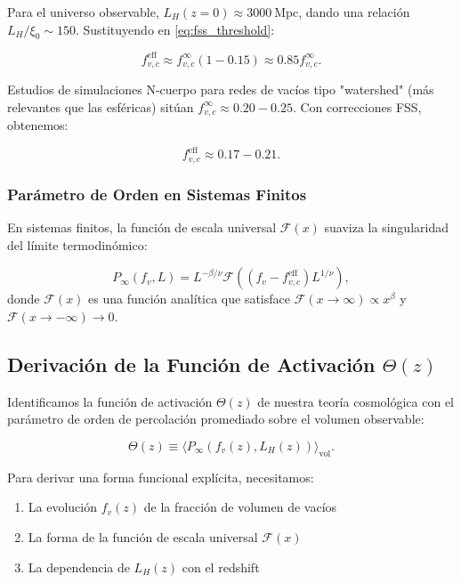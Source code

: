 \documentclass[12pt, a4paper]{article}
\theoremstyle{plain}
\theoremstyle{definition}
\begin{document}
Para el universo observable, $L_H(z=0) \approx 3000~\mathrm{Mpc}$, dando una relación $L_H/\xi_0 \sim 150$. Sustituyendo en \eqref{eq:fss_threshold}:

\begin{equation}
f_{v,c}^{\text{eff}} \approx f_{v,c}^{\infty} (1 - 0.15) \approx 0.85 f_{v,c}^{\infty}.
\end{equation}

Estudios de simulaciones N-cuerpo para redes de vacíos tipo "watershed" (más relevantes que las esféricas) sitúan $f_{v,c}^{\infty} \approx 0.20-0.25$. Con correcciones FSS, obtenemos:

\begin{equation}
f_{v,c}^{\text{eff}} \approx 0.17-0.21.
\label{eq:fv_critical_effective}
\end{equation}

\subsubsection{Parámetro de Orden en Sistemas Finitos}

En sistemas finitos, la función de escala universal $\mathcal{F}(x)$ suaviza la singularidad del límite termodinómico:

\begin{equation}
P_\infty(f_v, L) = L^{-\beta/\nu} \mathcal{F}\left( (f_v - f_{v,c}^{\text{eff}}) L^{1/\nu} \right),
\label{eq:fss_scaling}
\end{equation}
donde $\mathcal{F}(x)$ es una función analítica que satisface $\mathcal{F}(x \to \infty) \propto x^\beta$ y $\mathcal{F}(x \to -\infty) \to 0$.

\subsection{Derivación de la Función de Activación $\Theta(z)$}

Identificamos la función de activación $\Theta(z)$ de nuestra teoría cosmológica con el parámetro de orden de percolación promediado sobre el volumen observable:

\begin{equation}
\Theta(z) \equiv \langle P_\infty(f_v(z), L_H(z)) \rangle_{\text{vol}}.
\label{eq:theta_definition}
\end{equation}

Para derivar una forma funcional explícita, necesitamos:
\begin{enumerate}
    \item La evolución $f_v(z)$ de la fracción de volumen de vacíos
    \item La forma de la función de escala universal $\mathcal{F}(x)$
    \item La dependencia de $L_H(z)$ con el redshift
\end{enumerate}
\end{document}
